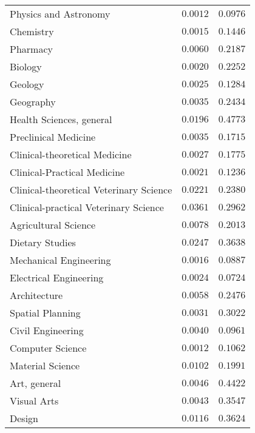 \begin{table}[h]
\begin{center}
\begin{tabular}{l c c}
Physics and Astronomy                       & $0.0012$ & $0.0976$ \\
Chemistry                                   & $0.0015$ & $0.1446$ \\
Pharmacy                                    & $0.0060$ & $0.2187$ \\
Biology                                     & $0.0020$ & $0.2252$ \\
Geology                                     & $0.0025$ & $0.1284$ \\
Geography                                   & $0.0035$ & $0.2434$ \\
Health Sciences, general                    & $0.0196$ & $0.4773$ \\
Preclinical Medicine                        & $0.0035$ & $0.1715$ \\
Clinical-theoretical Medicine               & $0.0027$ & $0.1775$ \\
Clinical-Practical Medicine                 & $0.0021$ & $0.1236$ \\
Clinical-theoretical Veterinary Science     & $0.0221$ & $0.2380$ \\
Clinical-practical Veterinary Science       & $0.0361$ & $0.2962$ \\
Agricultural Science                        & $0.0078$ & $0.2013$ \\
Dietary Studies                             & $0.0247$ & $0.3638$ \\
Mechanical Engineering                      & $0.0016$ & $0.0887$ \\
Electrical Engineering                      & $0.0024$ & $0.0724$ \\
Architecture                                & $0.0058$ & $0.2476$ \\
Spatial Planning                            & $0.0031$ & $0.3022$ \\
Civil Engineering                           & $0.0040$ & $0.0961$ \\
Computer Science                            & $0.0012$ & $0.1062$ \\
Material Science                            & $0.0102$ & $0.1991$ \\
Art, general                                & $0.0046$ & $0.4422$ \\
Visual Arts                                 & $0.0043$ & $0.3547$ \\
Design                                      & $0.0116$ & $0.3624$ \\

\end{tabular}
\end{center}
\end{table}
